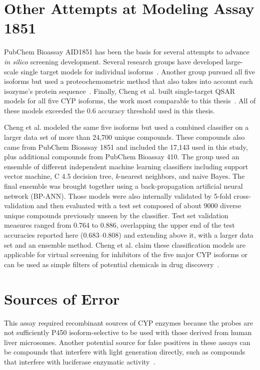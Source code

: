 
\section{Other Attempts at Modeling Assay 1851}
PubChem Bioassay AID1851 has been the basis for several attempts to advance \textit{in silico} screening development. Several research groups have developed large-scale single target models for individual isoforms~\cite{Vasanthanathan2009,Sridhar2012,Sun2012,Novotarskyi2010}. Another group pursued all five isoforms but used a proteochemometric method that also takes into account each isozyme's protein sequence~\cite{Lapins2013}. Finally, Cheng et al. built single-target QSAR models for all five CYP isoforms, the work most comparable to this thesis~\cite{Cheng2011}. All of these models exceeded the 0.6 accuracy threshold used in this thesis.

Cheng et al. modeled the same five isoforms but used a combined classifier on a larger data set of more than 24,700 unique compounds. These compounds also came from PubChem Bioassay 1851 and included the 17,143 used in this study, plus additional compounds from PubChem Bioassay 410. The group used an ensemble of different independent machine learning classifiers including support vector machine, C 4.5 decision tree, \textit{k}-nearest neighbors, and naive Bayes. The final ensemble was brought together using a back-propagation artificial neural network (BP-ANN). Those models were also internally validated by 5-fold cross-validation and then evaluated with a test set composed of about 9000 diverse unique compounds previously unseen by the classifier. Test set validation measures ranged from 0.764 to 0.886, overlapping the upper end of the test accuracies reported here (0.683--0.808) and extending above it, with a larger data set and an ensemble method. Cheng et al. claim these classification models are applicable for virtual screening for inhibitors of the five major CYP isoforms or can be used as simple filters of potential chemicals in drug discovery~\cite{Cheng2011}.


\section{Sources of Error}
This assay required recombinant sources of CYP enzymes because the probes are not sufficiently P450 isoform-selective to be used with those derived from human liver microsomes. Another potential source for false positives in these assays can be compounds that interfere with light generation directly, such as compounds that interfere with luciferase enzymatic activity~\cite{Zlokarnik2005}.

